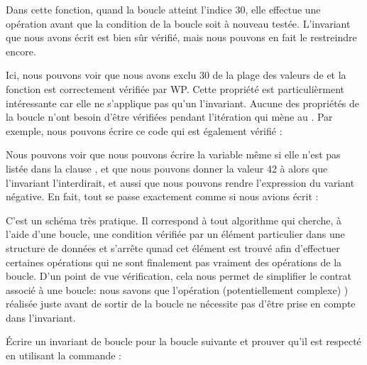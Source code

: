 

Dans cette fonction, quand la boucle atteint l'indice 30, elle effectue une opération
 avant que la condition de la boucle soit à nouveau testée. 
L'invariant que nous avons écrit est bien sûr vérifié, mais nous pouvons en fait le
restreindre encore.






Ici, nous pouvons voir que nous avons exclu 30 de la plage des valeurs de
 et la fonction est correctement vérifiée par WP. Cette propriété
est particulièrment intéressante car elle ne s'applique pas qu'un l'invariant. 
Aucune des propriétés de la boucle n'ont besoin d'être vérifiées pendant l'itération
qui mène au . Par exemple, nous pouvons écrire ce code qui est
également vérifié :





Nous pouvons voir que nous pouvons écrire la variable  même si elle
n'est pas listée dans la clause , et que nous pouvons
donner la valeur 42 à  alors que l'invariant l'interdirait, et aussi
que nous pouvons rendre l'expression du variant négative. En fait, tout se passe
exactement comme si nous avions écrit :





C'est un schéma très pratique. Il correspond à tout algorithme qui cherche, à l'aide
d'une boucle, une condition vérifiée par un élément particulier dans une structure 
de données et s'arrête qunad cet élément est trouvé afin d'effectuer certaines
opérations qui ne sont finalement pas vraiment des opérations de la boucle. D'un
point de vue vérification, cela nous permet de simplifier le contrat associé à une
boucle: nous savons que l'opération (potentiellement complexe) ) réalisée juste 
avant de sortir de la boucle ne nécessite pas d'être prise en compte dans
l'invariant.






Écrire un invariant de boucle pour la boucle suivante et prouver qu'il est respecté
en utilisant la commande :


